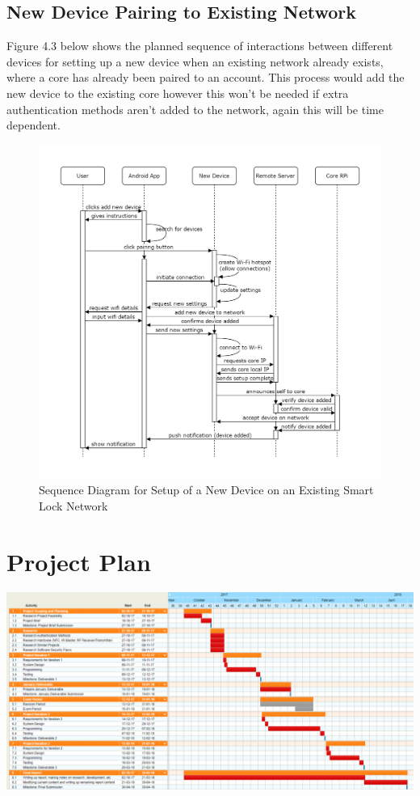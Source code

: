 \subsection{New Device Pairing to Existing Network}
Figure 4.3 below shows the planned sequence of interactions between different devices for setting up a new device when an existing network already exists, where a core has already been paired to an account. This process would add the new device to the existing core however this won't be needed if extra authentication methods aren't added to the network, again this will be time dependent.
\begin{figure}[H]
	\caption{Sequence Diagram for Setup of a New Device on an Existing Smart Lock Network}
	\centering
		\includegraphics[height=0.6\textheight,keepaspectratio]{"Graphics/New Device Pairing to Network"}
\end{figure}

\newpage
\section{Project Plan}
\begin{center}
	\includegraphics[angle=90,width=\textwidth,height=\textheight,keepaspectratio]{Graphics/FYP-Project-Plan}
\end{center}

